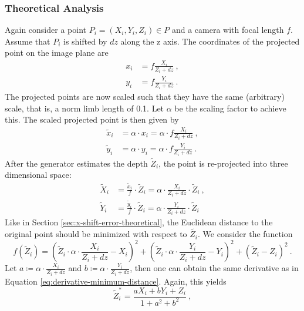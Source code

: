 \subsubsection{Theoretical Analysis}
Again consider a point $P_i=(X_i, Y_i, Z_i) \in P$ and a camera with focal length $f$. Assume that $P_i$ is shifted by $dz$ along the z axis.
The coordinates of the projected point on the image plane are
\begin{align}
	x_i &= f \frac{X_i}{Z_i + dz} \ , \\
	y_i &= f \frac{Y_i}{Z_i + dz} \ .
\end{align}
The projected points are now scaled such that they have the same (arbitrary) scale, that is, a norm limb length of 0.1.
Let $\alpha$ be the scaling factor to achieve this.
The scaled projected point is then given by
\begin{align}
		\widetilde{x}_i &= \alpha \cdot x_i 
		= \alpha \cdot f \frac{X_i}{Z_i + dz} \ , \\
		\widetilde{y}_i &= \alpha \cdot y_i
		= \alpha \cdot f \frac{Y_i}{Z_i + dz} \ .
\end{align}
After the generator estimates the depth $\widetilde{Z}_i$, the point is re-projected into three dimensional space:
\begin{align}
	\widetilde{X}_i &= \frac{\widetilde{x}_i}{f} \cdot \widetilde{Z}_i
	= \alpha \cdot \frac{X_i}{Z_i + dz} \cdot \widetilde{Z}_i \ , \\
	\widetilde{Y}_i &= \frac{\widetilde{y}_i}{f} \cdot \widetilde{Z}_i
	= \alpha \cdot \frac{Y_i}{Z_i + dz}\cdot \widetilde{Z}_i
\end{align}
Like in Section \ref{sec:x-shift-error-theoretical}, the Euclidean distance to the original point should be minimized with respect to $\widetilde{Z_i}$.
We consider the function
\begin{equation}
	f(\widetilde{Z}_i) = \left ( \widetilde{Z}_i \cdot \alpha  \cdot \frac{X_i}{Z_i + dz}- X_i \right)^2 + 
					\left ( \widetilde{Z}_i \cdot \alpha \cdot \frac{Y_i}{Z_i + dz} - Y_i \right)^2
					 + \left ( \widetilde{Z}_i - Z_i \right)^2 \ .
\end{equation}
Let $a \coloneqq \alpha \cdot \frac{X_i}{Z_i + dz}$ and $b \coloneqq \alpha \cdot \frac{Y_i}{Z_i + dz}$, then one can obtain the same derivative as in Equation \eqref{eq:derivative-minimum-distance}.
Again, this yields
\begin{equation}
	\widetilde{Z}_i^\ast = \frac{a X_i + b Y_i + Z_i}{1 + a^2 + b^2} \ ,
\end{equation}
